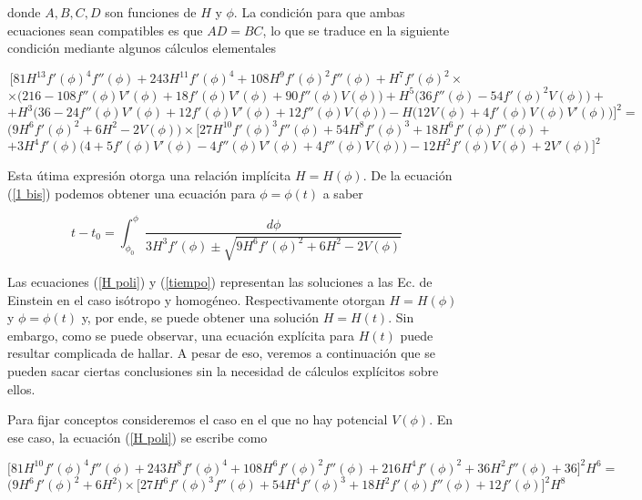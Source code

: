 donde $A,B,C,D$ son funciones de $H$ y $\phi$. La condición para que ambas ecuaciones sean compatibles es que $AD=BC$, lo que se traduce en la siguiente condición mediante algunos cálculos elementales



$$
\bigg[81H^{13}f'(\phi)^4f''(\phi)+243H^{11}f'(\phi)^4+108H^9f'(\phi)^2f''(\phi)+H^7f'(\phi)^2 \times
$$
$$
\times  \bigg(216-108f''(\phi)V'(\phi)+18f'(\phi)V'(\phi)+90f''(\phi)V(\phi)\bigg)+H^5\bigg(36f''(\phi)-54f'(\phi)^2V(\phi)\bigg)+
$$
$$
+H^3\bigg(36-24f''(\phi)V'(\phi)+12f'(\phi)V'(\phi)+12f''(\phi)V(\phi)\bigg)-H\bigg(12V(\phi)+4f'(\phi)V(\phi)V'(\phi)\bigg)\bigg]^2=
$$
$$
\bigg(9H^6f'(\phi)^2+6H^2-2V(\phi)\bigg)\times\bigg[27H^{10}f'(\phi)^3f''(\phi)+54H^8f'(\phi)^3+18H^6f'(\phi)f''(\phi)+
$$
\begin{equation}\label{H poli}
+3H^4f'(\phi)\bigg(4+5f'(\phi)V'(\phi)-4f''(\phi)V'(\phi)+4f''(\phi)V(\phi)\bigg)-12H^2f'(\phi)V(\phi)+2V'(\phi)\bigg]^2
\end{equation}


Esta útima expresión otorga una relación implícita $H=H(\phi)$. De la ecuación (\ref{1 bis}) podemos obtener una ecuación para $\phi=\phi(t)$ a saber


\begin{equation}\label{tiempo}
t-t_0=\int_{\phi_0}^{\phi} \frac{d\phi}{3H^3f'(\phi)\pm \sqrt{9H^6f'(\phi)^2+6H^2-2V(\phi)}}
\end{equation}


Las ecuaciones (\ref{H poli}) y (\ref{tiempo}) representan las soluciones a las Ec. de Einstein en el caso isótropo y homogéneo. Respectivamente otorgan $H=H(\phi)$ y $\phi=\phi(t)$ y, por ende, se puede obtener una solución $H=H(t)$. Sin embargo, como se puede observar, una ecuación explícita para $H(t)$ puede resultar complicada de hallar. A pesar de eso, veremos a continuación que se pueden sacar ciertas conclusiones sin la necesidad de cálculos explícitos sobre ellos.

Para fijar conceptos consideremos el caso en el que no hay potencial $V(\phi)$. En ese caso, la ecuación (\ref{H poli}) se escribe como

$$
\bigg[81H^{10}f'(\phi)^4f''(\phi)+243H^8f'(\phi)^4+108H^6f'(\phi)^2f''(\phi)+216H^4f'(\phi)^2 +36H^2f''(\phi)+36\bigg]^2H^6=
$$
\begin{equation}\label{compo}
    \bigg(9H^6f'(\phi)^2+6H^2\bigg)\times\bigg[27H^6f'(\phi)^3f''(\phi)+54H^4f'(\phi)^3+18H^2f'(\phi)f''(\phi)+12f'(\phi)\bigg]^2H^8
\end{equation}



